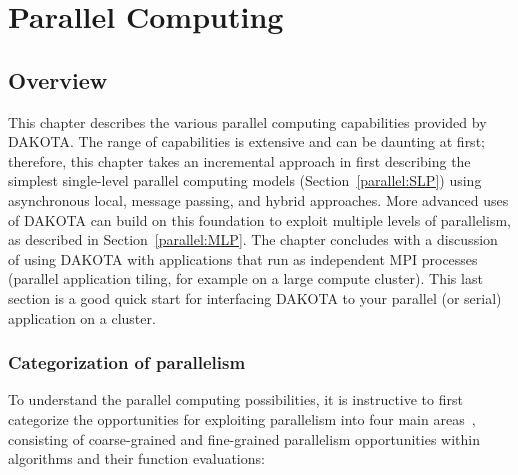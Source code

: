 \chapter{Parallel Computing}\label{parallel}


\section{Overview}\label{parallel:overview}

This chapter describes the various parallel computing capabilities
provided by DAKOTA.  The range of capabilities is extensive and can be
daunting at first; therefore, this chapter takes an incremental
approach in first describing the simplest single-level parallel
computing models (Section~\ref{parallel:SLP}) using asynchronous
local, message passing, and hybrid approaches.  More advanced uses of
DAKOTA can build on this foundation to exploit multiple levels of
parallelism, as described in Section~\ref{parallel:MLP}.  The chapter
concludes with a discussion of using DAKOTA with applications that run
as independent MPI processes (parallel application tiling, for example
on a large compute cluster).  This last section is a good quick start
for interfacing DAKOTA to your parallel (or serial) application on a
cluster.



\subsection{Categorization of parallelism}\label{parallel:overview:cat}

To understand the parallel computing possibilities, it is instructive
to first categorize the opportunities for exploiting parallelism into
four main areas~\cite{Eld98a}, consisting of coarse-grained and
fine-grained parallelism opportunities within algorithms and their
function evaluations:

